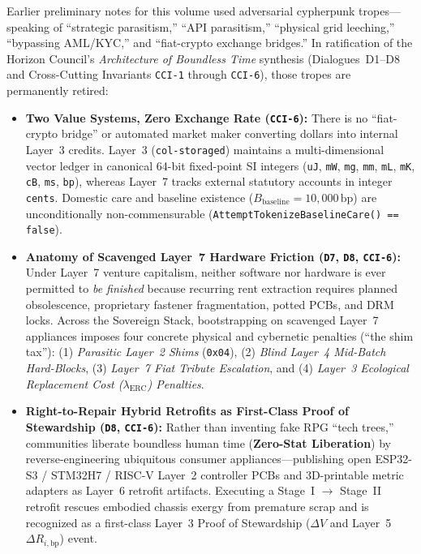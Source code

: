 Earlier preliminary notes for this volume used adversarial cypherpunk tropes---speaking of ``strategic parasitism,'' ``API parasitism,'' ``physical grid leeching,'' ``bypassing AML/KYC,'' and ``fiat-crypto exchange bridges.'' In ratification of the Horizon Council's \textit{Architecture of Boundless Time} synthesis (Dialogues~D1--D8 and Cross-Cutting Invariants \texttt{CCI-1} through \texttt{CCI-6}), those tropes are permanently retired:
\begin{itemize}
    \item \textbf{Two Value Systems, Zero Exchange Rate (\texttt{CCI-6}):} There is no ``fiat-crypto bridge'' or automated market maker converting dollars into internal Layer~3 credits. Layer~3 (\texttt{col-storaged}) maintains a multi-dimensional vector ledger in canonical 64-bit fixed-point SI integers (\texttt{uJ}, \texttt{mW}, \texttt{mg}, \texttt{mm}, \texttt{mL}, \texttt{mK}, \texttt{cB}, \texttt{ms}, \texttt{bp}), whereas Layer~7 tracks external statutory accounts in integer \texttt{cents}. Domestic care and baseline existence ($B_{\mathrm{baseline}} = 10{,}000\,\mathrm{bp}$) are unconditionally non-commensurable (\texttt{AttemptTokenizeBaselineCare() == false}).
    \item \textbf{Anatomy of Scavenged Layer~7 Hardware Friction (\texttt{D7}, \texttt{D8}, \texttt{CCI-6}):} Under Layer~7 venture capitalism, neither software nor hardware is ever permitted to \textit{be finished} because recurring rent extraction requires planned obsolescence, proprietary fastener fragmentation, potted PCBs, and DRM locks. Across the Sovereign Stack, bootstrapping on scavenged Layer~7 appliances imposes four concrete physical and cybernetic penalties (``the shim tax''): (1) \textit{Parasitic Layer~2 Shims} (\texttt{0x04}), (2) \textit{Blind Layer~4 Mid-Batch Hard-Blocks}, (3) \textit{Layer~7 Fiat Tribute Escalation}, and (4) \textit{Layer~3 Ecological Replacement Cost ($\lambda_{\mathrm{ERC}}$) Penalties}.
    \item \textbf{Right-to-Repair Hybrid Retrofits as First-Class Proof of Stewardship (\texttt{D8}, \texttt{CCI-6}):} Rather than inventing fake RPG ``tech trees,'' communities liberate boundless human time (\textbf{Zero-Stat Liberation}) by reverse-engineering ubiquitous consumer appliances---publishing open ESP32-S3 / STM32H7 / RISC-V Layer~2 controller PCBs and 3D-printable metric adapters as Layer~6 retrofit artifacts. Executing a Stage~I $\to$ Stage~II retrofit rescues embodied chassis exergy from premature scrap and is recognized as a first-class Layer~3 Proof of Stewardship ($\Delta V$ and Layer~5 $\Delta R_{i,\mathrm{bp}}$) event.

\end{itemize}
